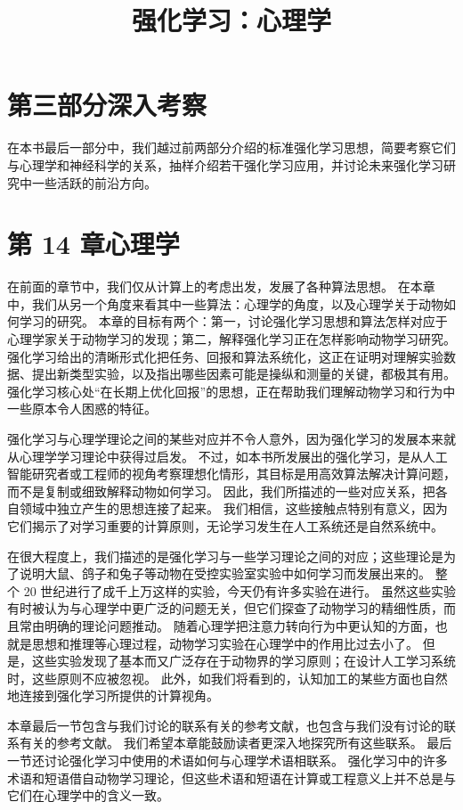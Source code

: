 \documentclass[UTF8,12pt,a4paper,fontset=fandol]{ctexart}
\title{强化学习：心理学}
\author{}
\date{}
\begin{document}
\maketitle

\section*{第三部分\quad 深入考察}

在本书最后一部分中，我们越过前两部分介绍的标准强化学习思想，简要考察它们与心理学和神经科学的关系，抽样介绍若干强化学习应用，并讨论未来强化学习研究中一些活跃的前沿方向。

\section*{第 14 章\quad 心理学}

在前面的章节中，我们仅从计算上的考虑出发，发展了各种算法思想。
在本章中，我们从另一个角度来看其中一些算法：心理学的角度，以及心理学关于动物如何学习的研究。
本章的目标有两个：第一，讨论强化学习思想和算法怎样对应于心理学家关于动物学习的发现；第二，解释强化学习正在怎样影响动物学习研究。
强化学习给出的清晰形式化把任务、回报和算法系统化，这正在证明对理解实验数据、提出新类型实验，以及指出哪些因素可能是操纵和测量的关键，都极其有用。
强化学习核心处“在长期上优化回报”的思想，正在帮助我们理解动物学习和行为中一些原本令人困惑的特征。

强化学习与心理学理论之间的某些对应并不令人意外，因为强化学习的发展本来就从心理学学习理论中获得过启发。
不过，如本书所发展出的强化学习，是从人工智能研究者或工程师的视角考察理想化情形，其目标是用高效算法解决计算问题，而不是复制或细致解释动物如何学习。
因此，我们所描述的一些对应关系，把各自领域中独立产生的思想连接了起来。
我们相信，这些接触点特别有意义，因为它们揭示了对学习重要的计算原则，无论学习发生在人工系统还是自然系统中。

在很大程度上，我们描述的是强化学习与一些学习理论之间的对应；这些理论是为了说明大鼠、鸽子和兔子等动物在受控实验室实验中如何学习而发展出来的。
整个 20 世纪进行了成千上万这样的实验，今天仍有许多实验在进行。
虽然这些实验有时被认为与心理学中更广泛的问题无关，但它们探查了动物学习的精细性质，而且常由明确的理论问题推动。
随着心理学把注意力转向行为中更认知的方面，也就是思想和推理等心理过程，动物学习实验在心理学中的作用比过去小了。
但是，这些实验发现了基本而又广泛存在于动物界的学习原则；在设计人工学习系统时，这些原则不应被忽视。
此外，如我们将看到的，认知加工的某些方面也自然地连接到强化学习所提供的计算视角。

本章最后一节包含与我们讨论的联系有关的参考文献，也包含与我们没有讨论的联系有关的参考文献。
我们希望本章能鼓励读者更深入地探究所有这些联系。
最后一节还讨论强化学习中使用的术语如何与心理学术语相联系。
强化学习中的许多术语和短语借自动物学习理论，但这些术语和短语在计算或工程意义上并不总是与它们在心理学中的含义一致。
\end{document}
